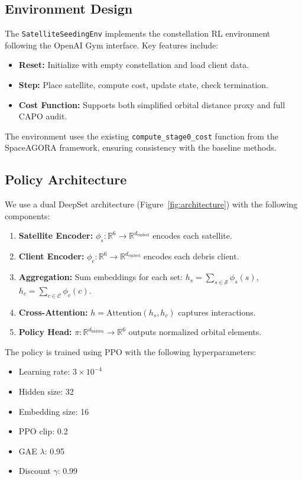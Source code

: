 \subsection{Environment Design}

The \texttt{SatelliteSeedingEnv} implements the constellation RL environment following the OpenAI Gym interface. Key features include:

\begin{itemize}
    \item \textbf{Reset:} Initialize with empty constellation and load client data.
    \item \textbf{Step:} Place satellite, compute cost, update state, check termination.
    \item \textbf{Cost Function:} Supports both simplified orbital distance proxy and full CAPO audit.
\end{itemize}

The environment uses the existing \texttt{compute\_stage0\_cost} function from the SpaceAGORA framework, ensuring consistency with the baseline methods.

\subsection{Policy Architecture}

We use a dual DeepSet architecture (Figure~\ref{fig:architecture}) with the following components:

\begin{enumerate}
    \item \textbf{Satellite Encoder:} $\phi_s: \mathbb{R}^6 \rightarrow \mathbb{R}^{d_{\text{embed}}}$ encodes each satellite.
    \item \textbf{Client Encoder:} $\phi_c: \mathbb{R}^6 \rightarrow \mathbb{R}^{d_{\text{embed}}}$ encodes each debris client.
    \item \textbf{Aggregation:} Sum embeddings for each set: $h_s = \sum_{s \in \mathcal{S}} \phi_s(s)$, $h_c = \sum_{c \in \mathcal{C}} \phi_c(c)$.
    \item \textbf{Cross-Attention:} $h = \text{Attention}(h_s, h_c)$ captures interactions.
    \item \textbf{Policy Head:} $\pi: \mathbb{R}^{d_{\text{hidden}}} \rightarrow \mathbb{R}^6$ outputs normalized orbital elements.
\end{enumerate}

The policy is trained using PPO with the following hyperparameters:
\begin{itemize}
    \item Learning rate: $3 \times 10^{-4}$
    \item Hidden size: 32
    \item Embedding size: 16
    \item PPO clip: 0.2
    \item GAE $\lambda$: 0.95
    \item Discount $\gamma$: 0.99
\end{itemize}

